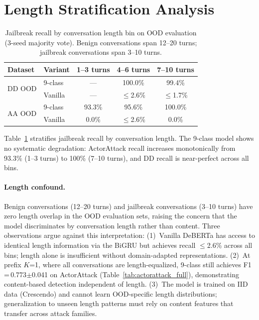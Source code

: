 \section{Length Stratification Analysis}
\label{app:length}

\begin{table}[ht]
\centering
\footnotesize
\caption{Jailbreak recall by conversation length bin on OOD evaluation (3-seed majority vote). Benign conversations span 12--20 turns; jailbreak conversations span 3--10 turns.}
\label{tab:length}
\begin{tabular}{@{}llccc@{}}
\toprule
\textbf{Dataset} & \textbf{Variant} & 1--3 turns & 4--6 turns & 7--10 turns \\
\midrule
\multirow{2}{*}{DD OOD} & 9-class & --- & 100.0\% & 99.4\% \\
& Vanilla & --- & $\leq$2.6\% & $\leq$1.7\% \\
\midrule
\multirow{2}{*}{AA OOD} & 9-class & 93.3\% & 95.6\% & 100.0\% \\
& Vanilla & 0.0\% & $\leq$2.6\% & 0.0\% \\
\bottomrule
\end{tabular}
\end{table}

Table~\ref{tab:length} stratifies jailbreak recall by conversation length. The 9-class model shows no systematic degradation: ActorAttack recall increases monotonically from 93.3\% (1--3 turns) to 100\% (7--10 turns), and DD recall is near-perfect across all bins.

\paragraph{Length confound.}
Benign conversations (12--20 turns) and jailbreak conversations (3--10 turns) have zero length overlap in the OOD evaluation sets, raising the concern that the model discriminates by conversation length rather than content. Three observations argue against this interpretation:
(1)~Vanilla DeBERTa has access to identical length information via the BiGRU but achieves recall $\leq$2.6\% across all bins; length alone is insufficient without domain-adapted representations.
(2)~At prefix $K$=1, where all conversations are length-equalized, 9-class still achieves F1\,=\,0.773$\pm$0.041 on ActorAttack (Table~\ref{tab:actorattack_full}), demonstrating content-based detection independent of length.
(3)~The model is trained on IID data (Crescendo) and cannot learn OOD-specific length distributions; generalization to unseen length patterns must rely on content features that transfer across attack families.

